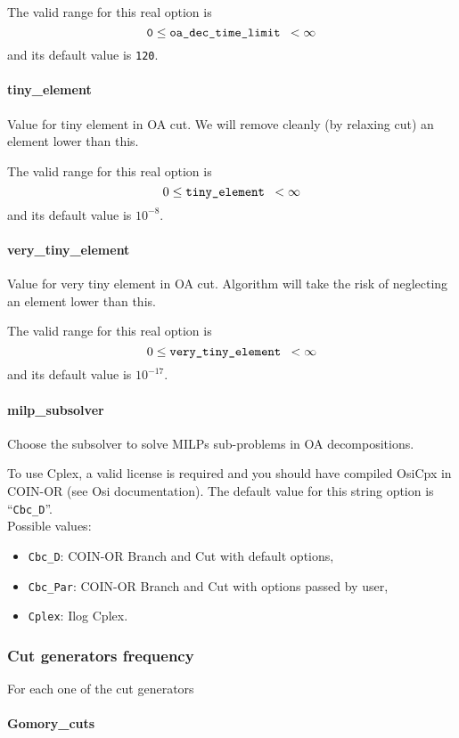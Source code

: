  The valid range for this real option is
$${\tt 0} \le \hbox{\tt oa\_dec\_time\_limit } <  \infty$$
and its default value is {\tt 120}.

\paragraph{tiny\_element}
\label{tiny_element}
Value for tiny element in OA cut.
We will remove cleanly (by relaxing cut) an element lower
than this.

The  valid range for this real option is
$$0 \le \hbox{\tt tiny\_element } <  \infty$$
and its default value is $10^{-8}$.

\paragraph{very\_tiny\_element}
\label{very_tiny_element}
Value for very tiny element in OA cut.
Algorithm will take the risk of neglecting an element lower
than this.

The  valid range for this real option is
$$0 \le \hbox{\tt very\_tiny\_element } <  \infty$$
and its default value is $10^{-17}$.

\paragraph{milp\_subsolver}
\label{milp_subsolver}
Choose the subsolver to solve MILPs sub-problems in OA decompositions.

  To use Cplex, a valid license is required and
you should have compiled OsiCpx in COIN-OR  (see Osi documentation).
The default value for this string option is ``{\tt Cbc\_D}''.
\\
Possible values:
\begin{itemize}
   \item {\tt Cbc\_D}: COIN-OR Branch and Cut with default options,
   \item {\tt Cbc\_Par}: COIN-OR Branch and Cut with options passed by user,
   \item {\tt Cplex}: Ilog Cplex.
\end{itemize}


\subsubsection{Cut generators frequency}
For each one of the cut generators
\paragraph{Gomory\_cuts}
\label{Gomory_cuts}
